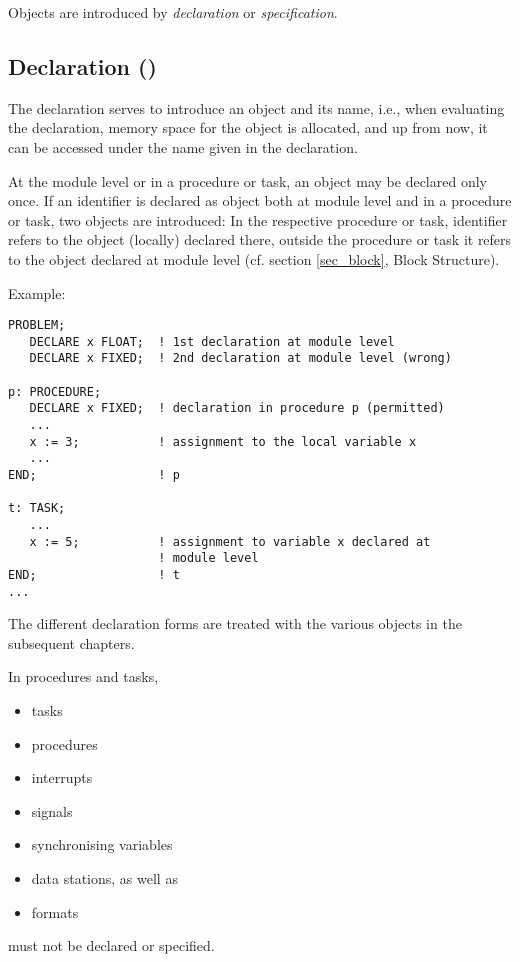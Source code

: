 Objects are introduced by {\it declaration} or {\it specification}.

\subsection{Declaration ()}  %
\label{sec_dcl}

The declaration serves to introduce an object and its name, i.e., when
evaluating the declaration, memory space for the object is allocated, and
up from now, it can be accessed under the name given in the
declaration.

At the module level or in a procedure or task, an object may be declared
only once. If an identifier  is declared as object both at module level
and in a procedure or task, two objects are introduced: In the
respective procedure or task, identifier  refers to the object
(locally) declared there, outside the procedure or task it refers to the
object declared at module level (cf. section \ref{sec_block}, Block Structure).

Example:

\begin{lstlisting}
PROBLEM;
   DECLARE x FLOAT;  ! 1st declaration at module level
   DECLARE x FIXED;  ! 2nd declaration at module level (wrong)

p: PROCEDURE; 
   DECLARE x FIXED;  ! declaration in procedure p (permitted)
   ...     
   x := 3;           ! assignment to the local variable x
   ...         
END;                 ! p

t: TASK;
   ...         
   x := 5;           ! assignment to variable x declared at
                     ! module level
END;                 ! t 
... 
\end{lstlisting}

The different declaration forms are treated with the various objects in
the subsequent chapters.

In procedures and tasks,
\begin{itemize}
\item tasks
\item procedures
\item interrupts
\item signals
\item synchronising variables
\item data stations, as well as
\item formats
\end{itemize}
must not be declared or specified.


